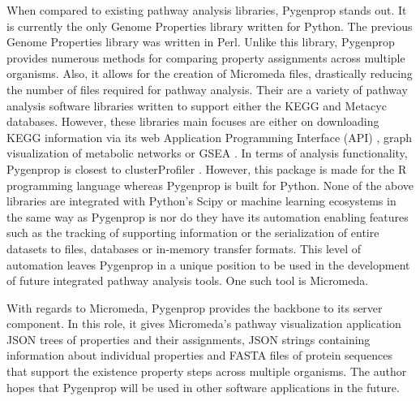When compared to existing pathway analysis libraries, Pygenprop stands out. It is currently the only Genome Properties library written for Python. The previous Genome Properties library was written in Perl. Unlike this library, Pygenprop provides numerous methods for comparing property assignments across multiple organisms. Also, it allows for the creation of Micromeda files, drastically reducing the number of files required for pathway analysis. Their are a variety of pathway analysis software libraries written to support either the KEGG \cite{zhang2009kegggraph,posma2013metabonetworks,yu2012clusterprofiler,cock2009biopython} and Metacyc \cite{international} databases. However, these libraries main focuses are either on downloading KEGG information via its web Application Programming Interface (API) \cite{cock2009biopython}, graph visualization of metabolic networks \cite{posma2013metabonetworks} or GSEA \cite{yu2012clusterprofiler}. In terms of analysis functionality, Pygenprop is closest to clusterProfiler \cite{yu2012clusterprofiler}. However, this package is made for the R programming language \cite{rprogman} whereas Pygenprop is built for Python. None of the above libraries are integrated with Python's Scipy \cite{scipystack} or machine learning ecosystems in the same way as Pygenprop is nor do they have its automation enabling features such as the tracking of supporting information or the serialization of entire datasets to files, databases or in-memory transfer formats. This level of automation leaves Pygenprop in a unique position to be used in the development of future integrated pathway analysis tools. One such tool is Micromeda.

With regards to Micromeda, Pygenprop provides the backbone to its server component. In this role, it gives Micromeda's pathway visualization application JSON trees of properties and their assignments, JSON strings containing information about individual properties and FASTA files of protein sequences that support the existence property steps across multiple organisms. The author hopes that Pygenprop will be used in other software applications in the future.
